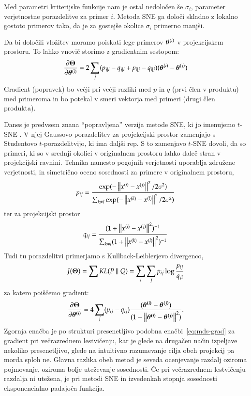 Med parametri kriterijske funkcije nam je ostal nedoločen še $\sigma_i$, parameter verjetnostne porazdelitve za primer $i$. Metoda SNE ga določi skladno z lokalno gostoto primerov tako, da je za gostejše okolice $\sigma_i$ primerno manjši.

Da bi določili vložitev moramo poiskati lege primerov $\boldsymbol{\theta}^{(i)}$ v projekcijskem prostoru. To lahko vnovič storimo z gradientnim sestopom:
%
\begin{equation}
\nonumber
\frac{\partial\boldsymbol{\Theta}}{\partial\boldsymbol{\theta}^{(i)}}=
  2\sum_j(p_{j|i}-q_{j|i}+p_{i|j}-q_{i|j})(\boldsymbol{\theta}^{(i)}-\boldsymbol{\theta}^{(j)})
\end{equation}
%
Gradient (popravek) bo večji pri večji razliki med $p$ in $q$ (prvi člen v produktu) med primeroma in bo potekal v smeri vektorja med primeri (drugi člen produkta).

Danes je predvsem znana ``popravljena'' verzija metode SNE, ki jo imenujemo $t$-SNE . V njej Gaussovo porazdelitev za projekcijski prostor zamenjajo s Studentovo $t$-porazdelitvijo, ki ima daljši rep. S to zamenjavo $t$-SNE dovoli, da so primeri, ki so v srednji okolici v originalnem prostoru lahko daleč stran v projekcijski ravnini. Tehnika namesto pogojnih verjetnosti uporablja združene verjetnosti, in simetrično oceno sosednosti za primere v originalnem prostoru,
%
\begin{equation}
  \nonumber
  p_{ij}=\frac{\exp(-\left\lVert x^{(i)}-x^{(j)}\right\rVert^2/2\sigma^2)}
  {\sum_{k\neq l}\exp(-\left\lVert x^{(k)}-x^{(l)}\right\rVert^2/2\sigma^2)}
\end{equation}
%
ter za projekcijski prostor
\begin{equation}
  \nonumber
  q_{ij}=\frac{(1+\left\lVert x^{(i)}-x^{(j)}\right\rVert^2)^{-1}}
  {\sum_{k\neq l}(1+\left\lVert x^{(k)}-x^{(l)}\right\rVert^2)^{-1}}
\end{equation}
%
Tudi tu porazdelitvi primerjamo s Kullback-Leiblerjevo divergenco,
\begin{equation}
  \nonumber
  J(\boldsymbol{\Theta}) = \sum KL(P\ ||\ Q)=\sum_i\sum_j p_{ij}\log\frac{p_{ij}}{q_{ji}}
\end{equation}
za katero poiščemo gradient:
%
\begin{equation}
  \nonumber
  \frac{\partial\boldsymbol{\Theta}}{\partial\boldsymbol{\theta^{(i)}}} = 4\sum_j(p_{ij}-q_{ij})
\frac{(\boldsymbol{\theta^{(i)}}-\boldsymbol{\theta^{(j)}})}{(1+\left\lVert\boldsymbol{\theta^{(i)}}-\boldsymbol{\theta^{(j)}}\right\rVert^2)}.
\end{equation}
Zgornja enačba je po strukturi presenetljivo podobna enačbi~\ref{eq:mds-grad}  za gradient pri večrazrednem lestvičenju, kar je glede na drugačen način izpeljave nekoliko presenetljivo, glede na intuitivno razumevanje cilja obeh projekcij pa morda sploh ne. Glavna razlika obeh metod je seveda ocenjevanje razdalj oziroma pojmovanje, oziroma bolje uteževanje sosednosti. Če pri večrazrednem lestvičenju razdalja ni utežena, je pri metodi SNE in izvedenkah stopnja sosednosti eksponencialno padajoča funkcija.

